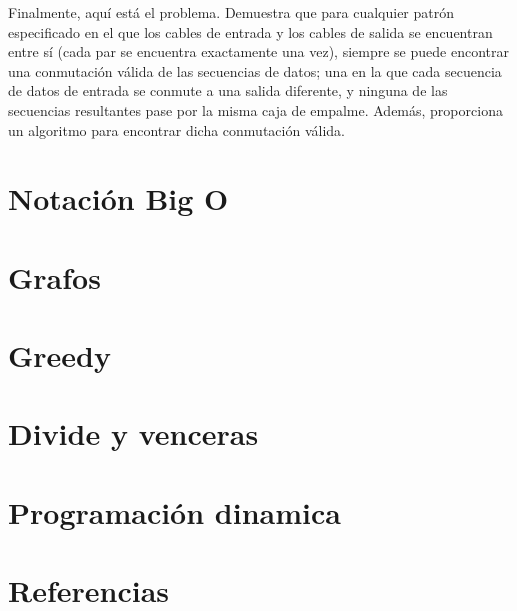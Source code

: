 \documentclass{article}
\begin{document}
Finalmente, aquí está el problema. Demuestra que para cualquier patrón especificado en el que los cables de entrada y los cables de salida se encuentran entre sí (cada par se encuentra exactamente una vez), siempre se puede encontrar una conmutación válida de las secuencias de datos; una en la que cada secuencia de datos de entrada se conmute a una salida diferente, y ninguna de las secuencias resultantes pase por la misma caja de empalme. Además, proporciona un algoritmo para encontrar dicha conmutación válida.

\newpage


\newpage


\section{Notación Big O}
\section{Grafos}
\section{Greedy}
\section{Divide y venceras}
\section{Programación dinamica}
\section{Referencias}
\end{document}
